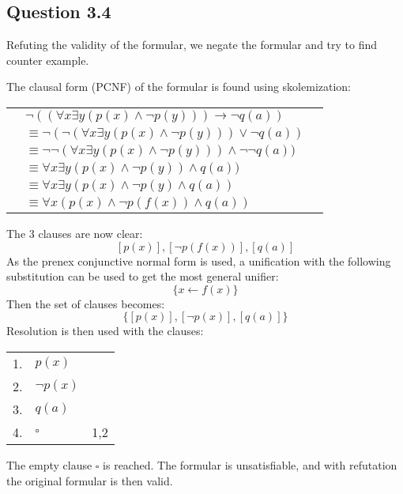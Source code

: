 \newpage
\subsection*{Question 3.4}
Refuting the validity of the formular, we negate the formular and try to find counter example.

The clausal form (PCNF) of the formular is found using skolemization:

\begin{center}
    \begin{tabular}{ clr }
        & $\neg ((\forall x \exists y (p(x) \land \neg p(y))) \to \neg q(a))$ \\
        & $\equiv \neg (\neg (\forall x \exists y (p(x) \land \neg p(y))) \lor \neg q(a))$ \\
        & $\equiv \neg \neg (\forall x \exists y (p(x) \land \neg p(y))) \land \neg \neg q(a))$ \\
        & $\equiv \forall x \exists y (p(x) \land \neg p(y)) \land q(a))$ \\
        & $\equiv \forall x \exists y (p(x) \land \neg p(y) \land q(a))$ \\
        & $\equiv \forall x (p(x) \land \neg p(f(x)) \land q(a))$ \\
    \end{tabular}
\end{center}
The 3 clauses are now clear:
$$[p(x)] , [\neg p(f(x))] , [q(a)]$$
As the prenex conjunctive normal form is used, a unification with the following substitution can be used to get the most general unifier:
$$\{ x \leftarrow f(x)\}$$
Then the set of clauses becomes:
$$\{ [p(x)] , [\neg p(x)] , [q(a)] \}$$
Resolution is then used with the clauses:
\begin{center}
    \begin{tabular}{ clr }
        1. & $p(x)$ & \\
        2. & $\neg p(x)$ & \\
        3. & $q(a)$ & \\
        4. & $\square$ & 1,2 \\
    \end{tabular}
\end{center}
The empty clause $\square$ is reached. The formular is unsatisfiable, and with refutation the original formular is then valid.
